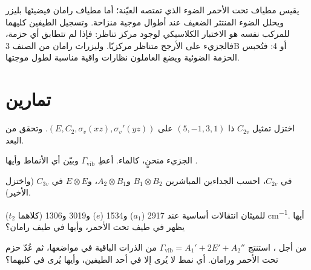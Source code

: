 \begin{inthelab}
يقيس مطياف تحت الأحمر الضوء الذي تمتصه العيّنة؛ أما مطياف
رامان فيضيئها بليزر ويحلل الضوء المنتثر الضعيف
عند أطوال موجية منزاحة. وتسجيل الطيفين كليهما للمركب نفسه هو
الاختبار الكلاسيكي لوجود مركز تناظر: فإذا لم تتطابق أي حزمة، فالجزيء
على الأرجح متناظر مركزيًا. وليزرات رامان من الصنف 3B أو 4: فتُحبس الحزمة
الضوئية ويضع العاملون نظارات واقية مناسبة لطول موجتها.
\end{inthelab}

\section{تمارين}

\begin{exercise}[$\star$]\label{exo:b3:group-theory-applied:1}
اختزل تمثيل $C_{2v}$ ذا  $(5, -1, 3, 1)$ على $(E, C_2,
\sigma_v(xz), \sigma_v'(yz))$. وتحقق من البعد.
\end{exercise}

\begin{exercise}[$\star$]\label{exo:b3:group-theory-applied:2}
الجزيء  منحنٍ، كالماء. أعطِ $\Gamma_{\mathrm{vib}}$ وبيّن أي الأنماط 
وأيها .
\end{exercise}

\begin{exercise}[$\star$]\label{exo:b3:group-theory-applied:3}
في $C_{2v}$، احسب الجداءين المباشرين $B_1\otimes B_2$ و$A_2\otimes B_1$، 
و$E\otimes E$ في $C_{3v}$ (واختزل الأخير).
\end{exercise}

\begin{exercise}[$\star$]\label{exo:b3:group-theory-applied:4}
للميثان  انتقالات أساسية عند 2917 ($a_1$) و1534 ($e$) و3019 و1306 (كلاهما $t_2$)
\unit{cm^{-1}}. أيها يظهر في طيف تحت الأحمر، وأيها في طيف
رامان؟
\end{exercise}

\begin{exercise}[$\star\star$]\label{exo:b3:group-theory-applied:5}
من أجل ، استنتج $\Gamma_{\mathrm{vib}} = A_1' + 2E' + A_2''$ من الذرات الباقية في
مواضعها، ثم عُدّ حزم تحت الأحمر ورامان. أي نمط لا يُرى إلا في أحد
الطيفين، وأيها يُرى في كليهما؟
\end{exercise}

